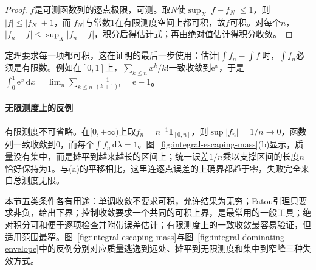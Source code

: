 \begin{proof}
$f$是可测函数列的逐点极限，可测。取$N$使$\sup_X|f-f_N|\le1$，则$|f|\le|f_N|+1$，而$|f_N|$与常数$1$在有限测度空间上都可积，故$f$可积。对每个$n$，$|f_n-f|\le\sup_X|f_n-f|$，积分后得估计式；再由绝对值估计得积分收敛。
\end{proof}

定理要求每一项都可积，这在证明的最后一步使用：估计$\bigl|\int f_n-\int f\bigr|$时，$\int f_n$必须是有限数。例如在$[0,1]$上，$\sum_{k\le n}x^k/k!$一致收敛到$\mathrm e^x$，于是$\int_0^1\mathrm e^x\,\mathrm dx=\lim_n\sum_{k\le n}\frac1{(k+1)!}=\mathrm e-1$。

\paragraph{无限测度上的反例}
有限测度不可省略。在$[0,+\infty)$上取$f_n=n^{-1}\mathbf 1_{[0,n]}$，则$\sup|f_n|=1/n\to0$，函数列一致收敛到$0$，而每个$\int f_n\,\mathrm d\lambda=1$。图~\ref{fig:integral-escaping-mass}(b)显示，质量没有集中，而是摊平到越来越长的区间上；统一误差$1/n$乘以支撑区间的长度$n$恰好保持为$1$。与(a)的平移相比，这里连逐点误差的上确界都趋于零，失败完全来自总测度无限。

本节五类条件各有用途：单调收敛不要求可积，允许结果为无穷；Fatou引理只要求非负，给出下界；控制收敛要求一个共同的可积上界，是最常用的一般工具；绝对积分可和便于逐项检查并附带误差估计；有限测度上的一致收敛最容易验证，但适用范围最窄。图~\ref{fig:integral-escaping-mass}与图~\ref{fig:integral-dominating-envelope}中的反例分别对应质量逃逸到远处、摊平到无限测度和集中到窄峰三种失效方式。
